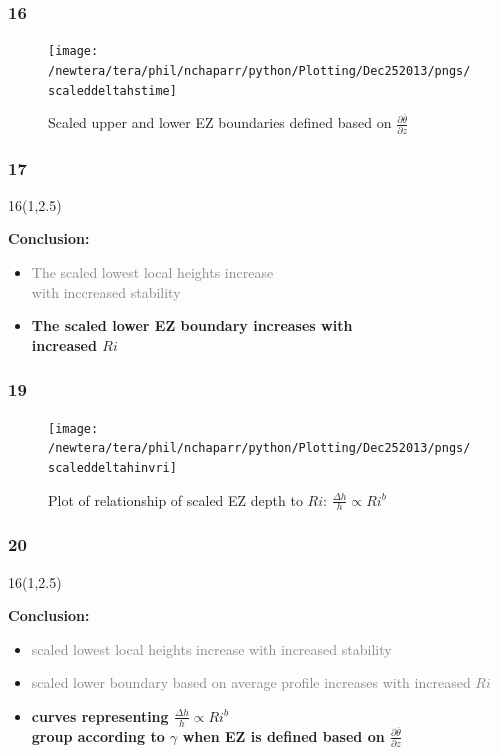 \documentclass{beamer}
\newcommand\FrameText[1]{
\begin{textblock}{16}(1,2.5)
\raggedright #1
\end{textblock}}
\begin{document}
\begin{frame}
\frametitle{16}
\fontsize{12pt}{7.2}\selectfont
\begin{figure}
\centering
\texttt{[image: /newtera/tera/phil/nchaparr/python/Plotting/Dec252013/pngs/scaleddeltahstime]}
\caption{Scaled upper and lower EZ boundaries defined based on $\frac{\partial \overline{\theta}}{\partial z}$}
\end{figure}

\end{frame}

\begin{frame}
\frametitle{17}
\FrameText{\bf{\large Conclusion:}
\vspace{5mm}
\begin{itemize}
\item \textcolor{gray}{The scaled lowest local heights increase\\
with inccreased stability}
\vspace{5mm}
\item \bf{\large The scaled lower EZ boundary increases with\\
increased $Ri$}\\
\end{itemize}
}
\end{frame}


\begin{frame}
\fontsize{12pt}{7.2}\selectfont
\frametitle{19}
\begin{figure}
\centering
\texttt{[image: /newtera/tera/phil/nchaparr/python/Plotting/Dec252013/pngs/scaleddeltahinvri]}
\caption{Plot of relationship of scaled EZ depth to $Ri$: $\frac{\Delta h}{h} \propto Ri ^{b}$}
\end{figure}
\end{frame}

\begin{frame}
\frametitle{20}
\FrameText{\bf{\large Conclusion}:
\vspace{5mm}
\begin{itemize}
\item \textcolor{gray}{scaled lowest local heights increase with increased stability}
\vspace{5mm}
\item \textcolor{gray}{scaled lower boundary based on average profile increases with increased $Ri$} \\
\vspace{5mm}
\item \bf{ \large curves representing  $\frac{\Delta h}{h} \propto Ri ^{b}$}\\
\bf{ \large group according to $\gamma$ when EZ is defined based on $\frac{\partial \overline{\theta}}{\partial z}$}
\end{itemize}
}
\end{frame}
\end{document}
